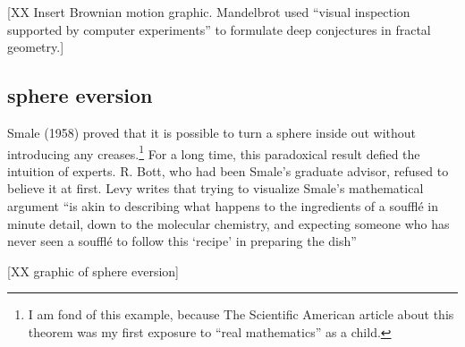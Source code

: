 \documentclass{llncs}
\begin{document}
[XX Insert Brownian motion graphic.  Mandelbrot used ``visual
inspection supported by computer experiments'' to formulate deep
conjectures in fractal geometry.]

%
%




\subsection{sphere eversion}







Smale (1958) proved that it is possible to turn a sphere inside out
without introducing any creases.\footnote{I am fond of this example,
because The Scientific American
  article \cite{Phi66} about this theorem was my first exposure to ``real
  mathematics'' as a child.}  For a long time, this paradoxical result
defied the intuition of experts.  R. Bott, who had been Smale's
graduate advisor, refused to believe it at first.  Levy writes that
trying to visualize Smale's mathematical argument ``is akin to
describing what happens to the ingredients of a souffl\'e in minute
detail, down to the molecular chemistry, and expecting someone who has
never seen a souffl\'e to follow this `recipe' in preparing the
dish''~\cite{Le95}

[XX graphic of sphere eversion]
\end{document}
